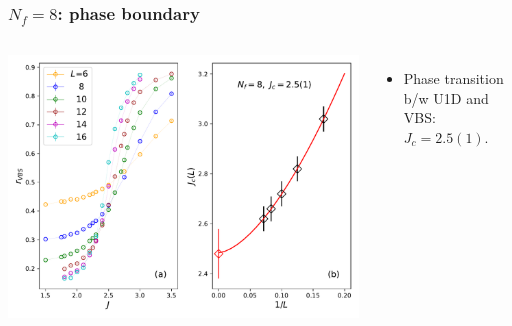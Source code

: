 \documentclass[xcolor=table, 10pt, aspectratio=43]{beamer}
\begin{document}
\begin{frame}
  \frametitle{$N_f=8$: phase boundary}
  \begin{columns}
    \includegraphics[width=\textwidth]{../u1sl/n8rvbs}
		\begin{itemize}
			\item Phase transition b/w U1D and VBS: $J_c=2.5(1)$.
		\end{itemize}
  \end{columns}
\end{frame}
\end{document}
